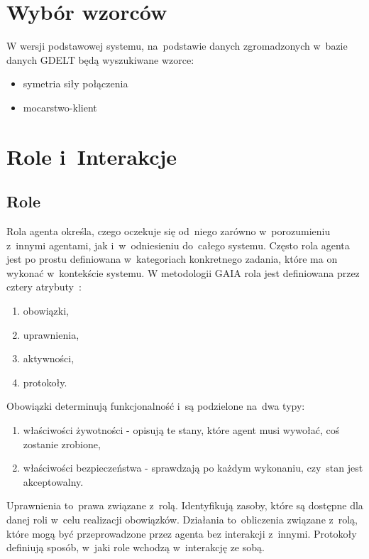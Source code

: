 \documentclass[11pt]{report}
\begin{document}
    \section{Wybór wzorców}\label{sec:wybór-wzorców}


    W wersji podstawowej systemu, na~podstawie danych zgromadzonych w~bazie danych GDELT będą wyszukiwane wzorce:
    \begin{itemize}
        \item symetria siły połączenia
        \item mocarstwo-klient
    \end{itemize}


    \section{Role i~Interakcje}

    \subsection{Role}
    Rola agenta określa, czego oczekuje się od~niego zarówno w~porozumieniu z~innymi agentami, jak i~w~odniesieniu do~całego systemu.
    Często rola agenta jest po prostu definiowana w~kategoriach konkretnego zadania, które ma on wykonać w~kontekście systemu.
    W metodologii GAIA rola jest definiowana przez cztery atrybuty~\cite{Wooldridge2000a}:
    \begin{enumerate}
        \item obowiązki,
        \item uprawnienia,
        \item aktywności,
        \item protokoły.
    \end{enumerate}
    Obowiązki determinują funkcjonalność i~są podzielone na~dwa typy:
    \begin{enumerate}
        \item właściwości żywotności - opisują te stany, które agent musi wywołać, coś zostanie zrobione,
        \item właściwości bezpieczeństwa - sprawdzają po każdym wykonaniu, czy~stan jest akceptowalny.
    \end{enumerate}
    Uprawnienia to~prawa związane z~rolą.
    Identyfikują zasoby, które są dostępne dla danej roli w~celu realizacji obowiązków.
    Działania to~obliczenia związane z~rolą, które mogą być przeprowadzone przez agenta bez interakcji z~innymi.
    Protokoły definiują sposób, w~jaki role wchodzą w~interakcję ze sobą.
\end{document}
